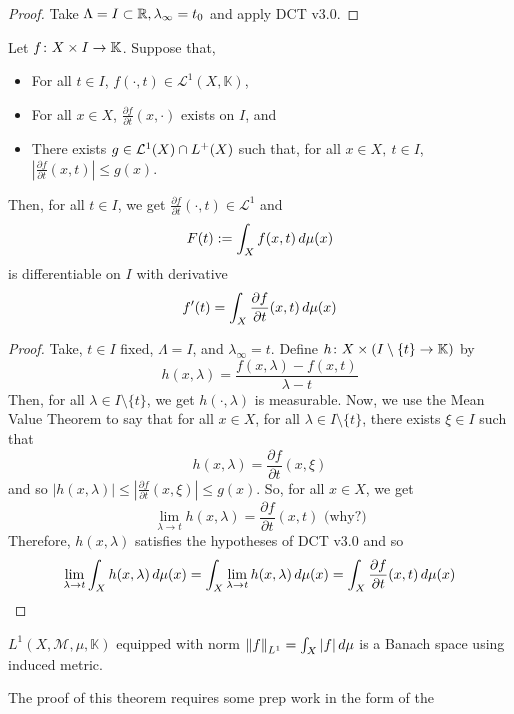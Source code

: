 \documentclass[11pt,leqno,oneside]{amsbook}
\numberwithin{thm}{section}
\newcommand{\M}{\mathcal{M}} %
\newcommand{\cL}{\mathcal{L}}
\newcommand{\K}{\mathbb{K}} %
\begin{document}
\begin{proof}
  Take \(\Lambda = I \subset \R, \lambda_\infty = t_0\) and apply DCT
  v3.0.
\end{proof}
\begin{cor}
  Let \(f \from X \times I \to \K\). Suppose that,
  \begin{itemize}
  \item For all \(t \in  I\), \(f(\cdot, t) \in \cL^1(X,\K)\),
  \item For all \(x \in X\), \(\frac{\partial f}{\partial
      t}(x,\cdot)\) exists on \(I\), and
  \item There exists \(g \in \cL^1(X) \intersect L^+(X)\) such that,
    for all \(x \in X,\ t \in I\), \(\left| \frac{\partial f}{\partial
      t}(x,t)\right| \leq g(x)\).
  \end{itemize}
  Then, for all \(t \in I\), we get \(\frac{\partial f}{\partial
    t}(\cdot, t) \in \cL^1\)  and \[
    F(t) := \int_X f(x,t) \d\mu(x)
  \]
  is differentiable on \(I\) with derivative \[
    f'(t) = \int_X \frac{\partial f}{\partial t}(x,t) \d\mu(x)
  \]
\end{cor}
\begin{proof}
  Take, \(t \in I\) fixed, \(\Lambda = I\), and \(\lambda_\infty =
  t\). Define \(h \from X \times (I \setminus \{t\} \to \K)\) by
  \[h(x,\lambda) = \frac{f(x,\lambda) - f(x,t)}{\lambda - t}\]
  Then, for all \(\lambda \in I \setminus \{t\}\), we get \(h(\cdot,
  \lambda)\) is measurable. Now, we use the Mean Value Theorem to say
  that for all \(x \in X\), for all \(\lambda \in I \setminus \{t\}\),
  there exists \(\xi \in I\) such that \[
    h(x,\lambda) = \frac{\partial f}{\partial t}(x, \xi)
  \]
  and so \(|h(x,\lambda)| \leq \left| \frac{\partial f}{\partial
      t}(x,\xi) \right| \leq g(x)\). So, for all \(x \in X\), we
  get \[
    \lim_{\lambda \to t} h(x,\lambda) = \frac{\partial f}{\partial
      t}(x,t) \text{ (why?)}
  \]
  Therefore, \(h(x,\lambda)\) satisfies the hypotheses of DCT v3.0 and
  so \[
    \lim_{\lambda \to t} \int_X h(x,\lambda) \d \mu(x) = \int_X
    \lim_{\lambda \to t} h(x,\lambda) \d\mu(x) = \int_X \frac{\partial
      f}{\partial t}(x,t) \d\mu(x)
  \]
\end{proof}
\begin{thm}
  \(L^1(X,\M,\mu,\K)\) equipped with norm \(\norm[f]_{L^1} = \int_X
  |f|\d\mu\) is a Banach space using induced metric.
\end{thm}
The proof of this theorem requires some prep work in the form of the
\end{document}
